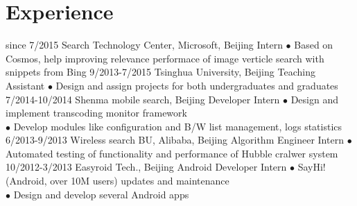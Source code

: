 \documentclass[]{friggeri-cv}
\begin{document}
\section{Experience}

\begin{entrylist}
  \entry
    {since 7/2015}
    {Search Technology Center, Microsoft, Beijing}
    {Intern}
    {$\bullet$ Based on Cosmos, help improving relevance performace of image verticle search with snippets from Bing}
  \entry
    {9/2013-7/2015}
    {Tsinghua University, Beijing}
    {Teaching Assistant}
    {$\bullet$ Design and assign projects for both undergraduates and graduates}
  \entry
    {7/2014-10/2014}
    {Shenma mobile search, Beijing}
    {Developer Intern}
    {$\bullet$ Design and implement transcoding monitor framework\\
    $\bullet$ Develop modules like configuration and B/W list management, logs statistics}
  \entry
    {6/2013-9/2013}
    {Wireless search BU, Alibaba, Beijing}
    {Algorithm Engineer Intern}
    {$\bullet$ Automated testing of functionality and performance of Hubble cralwer system}
  \entry
    {10/2012-3/2013}
    {Easyroid Tech., Beijing}
    {Android Developer Intern}
    {$\bullet$ SayHi!(Android, over 10M users) updates and maintenance\\
    $\bullet$ Design and develop several Android apps}
\end{entrylist}
\end{document}
